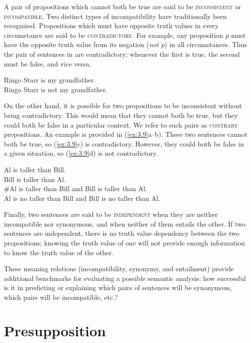 A pair of propositions which cannot both be true are said to be \textsc{inconsistent} or \textsc{incompatible}. Two distinct types of incompatibility have traditionally been recognized. Propositions which must have opposite truth values in every circumstance are said to be \textsc{contradictory}. For example, any proposition \textit{p} must have the opposite truth value from its negation (\textit{not p}) in all circumstances. Thus the pair of sentences in  are contradictory; whenever the first is true, the second must be false, and vice versa.


\ea \label{ex:3.8}
\ea Ringo Starr is my grandfather.\\
\ex Ringo Starr is not my grandfather.
                       \z
\z


On the other hand, it is possible for two propositions to be inconsistent without being contradictory. This would mean that they cannot both be true, but they could both be false in a particular context. We refer to such pairs as \textsc{contrary} propositions. An example is provided in (\ref{ex:3.9}a--b). These two sentences cannot both be true, so (\ref{ex:3.9}c) is contradictory. However, they could both be false in a given situation, so (\ref{ex:3.9}d) is not contradictory.


\ea \label{ex:3.9}
\ea Al is taller than Bill.\\
\ex Bill is taller than Al.\\
\ex \#Al is taller than Bill and Bill is taller than Al.\\
\ex Al is no taller than Bill and Bill is no taller than Al.
                       \z
\z


Finally, two sentences are said to be \textsc{independent} when they are neither incompatible nor synonymous, and when neither of them entails the other. If two sentences are independent, there is no truth value dependency between the two propositions; knowing the truth value of one will not provide enough information to know the truth value of the other.



These meaning relations (incompatibility, synonymy, and entailment) provide additional benchmarks for evaluating a possible semantic analysis: how successful is it in predicting or explaining which pairs of sentences will be synonymous, which pairs will be incompatible, etc.?


\section{Presupposition}\label{sec:} %

